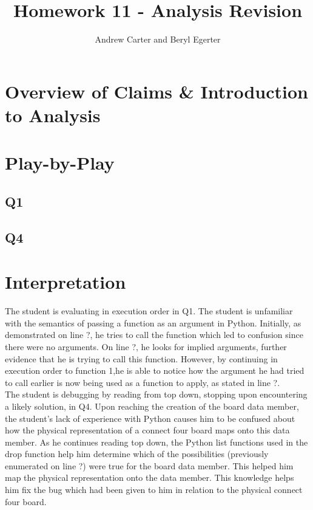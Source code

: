 \documentclass{article}
\title{Homework 11 - Analysis Revision}
\author{Andrew Carter and Beryl Egerter}
\begin{document}
\maketitle
\section{Overview of Claims \& Introduction to Analysis}

\section{Play-by-Play}
\subsection{Q1}
\subsection{Q4}

\section{Interpretation}

The student is evaluating in execution order in Q1.
The student is unfamiliar with the semantics of passing a function as an argument in Python.
Initially, as demonstrated on line ?, he tries to call the function which led to confusion since there were no arguments. On line ?, he looks for implied arguments, further evidence that he is trying to call this function.
However, by continuing in execution order to function 1,he is able to notice how the argument he had tried to call earlier is now being used as a function to apply, as stated in line ?.  \\

The student is debugging by reading from top down, stopping upon encountering a likely solution, in Q4.
Upon reaching the creation of the board data member, the student's lack of experience with Python causes him to be confused about how the physical representation of a connect four board maps onto this data member.
As he continues reading top down, the Python list functions used in the drop function help him determine which of the possibilities (previously enumerated on line ?) were true for the board data member.
This helped him map the physical representation onto the data member.
This knowledge helps him fix the bug which had been given to him in relation to the physical connect four board.  \\
\end{document}
